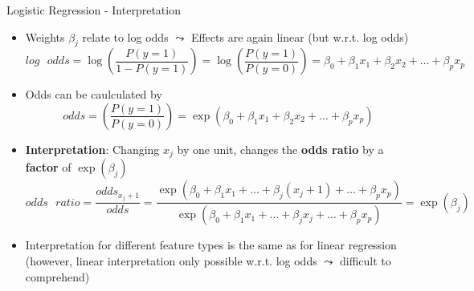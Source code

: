 \documentclass[11pt,compress,t,notes=noshow, aspectratio=169, xcolor=table]{beamer}
\begin{document}
\begin{frame}[c]{Logistic Regression - Interpretation}

    \begin{itemize}
        \item Weights $\beta_j$ relate to log odds $\leadsto$ Effects are again linear (but w.r.t. log odds)
        $$log\text{ }odds = \log \left(\frac{P(y = 1)}{1 - P(y=1)}\right) = \log \left(\frac{P(y = 1)}{P(y=0)}\right) = \beta_0 + \beta_1 x_1 + \beta_2 x_2 + \ldots + \beta_p x_p  $$
        \pause
        \item Odds can be caulculated by 
        $$odds = \left(\frac{P(y = 1)}{P(y=0)}\right) = \exp(\beta_0 + \beta_1 x_1 + \beta_2 x_2 + \ldots + \beta_p x_p)  $$
        \item \textbf{Interpretation}: Changing $x_j$ by one unit, changes the \textbf{odds ratio} by a \textbf{factor} of $\exp(\beta_j)$
        $$odds\text{ }ratio = \frac{odds_{x_j+1}}{odds} = \frac{\exp(\beta_0 + \beta_1 x_1 + \ldots + \beta_j (x_j+1) + \ldots + \beta_p x_p)}{\exp(\beta_0 + \beta_1 x_1 + \ldots + \beta_j x_j + \ldots + \beta_p x_p)} = \exp{(\beta_j)} $$
        \pause
        \item Interpretation for different feature types is the same as for linear regression (however, linear interpretation only possible w.r.t. log odds $\leadsto$ difficult to comprehend)
    \end{itemize}	

\end{frame}
\end{document}
